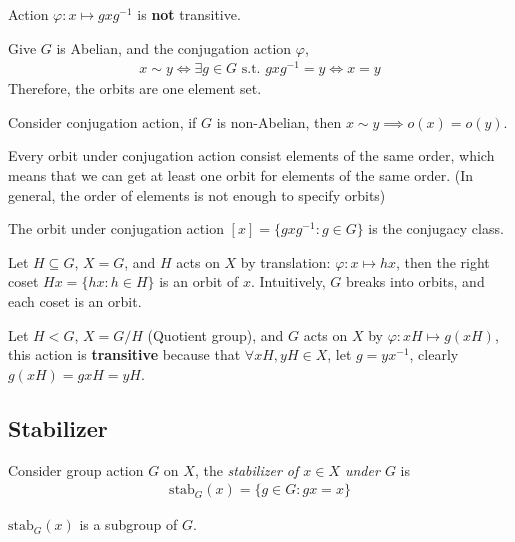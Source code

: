 \begin{remark}
    Action $\varphi: x \mapsto gxg^{-1}$ is \textbf{not} transitive.
\end{remark}

\begin{eg}
    Give $G$ is Abelian, and the conjugation action $\varphi$,
    \begin{align*}
        x \sim y \iff \exists g \in G \text{ s.t. } gxg^{-1}= y \iff x = y
    \end{align*}
    Therefore, the orbits are one element set.
\end{eg}

\begin{prop}
Consider conjugation action, if $G$ is non-Abelian, then $x \sim y \implies o(x) = o(y)$.
\end{prop}

\begin{observe}
    Every orbit under conjugation action consist elements of the same order, which means that we can get at least one orbit for elements of the same order. (In general, the order of elements is not enough to specify orbits)
\end{observe}

\begin{definition}
The orbit under conjugation action $[x] = \{ gxg^{-1} : g \in G \}$ is the conjugacy class.
\end{definition}

\begin{eg}
Let $H \subseteq G$, $X = G$, and $H$ acts on $X$ by translation: $\varphi: x \mapsto hx$, then the right coset $Hx = \{ hx : h \in H \}$ is an orbit of $x$. Intuitively, $G$ breaks into orbits, and each coset is an orbit.
\end{eg}

\begin{eg}
Let $H < G$, $X = G/H$ (Quotient group), and $G$ acts on $X$ by $\varphi: xH \mapsto g(xH)$, this action is \textbf{transitive} because that $\forall xH, yH \in X$, let $g = yx^{-1}$, clearly $g(xH) = gxH = yH$.
\end{eg}

\subsection{Stabilizer} \label{sec:}

\begin{definition}[Stabilizer]
    Consider group action $G$ on $X$, the \textit{stabilizer of $x \in X$ under $G$} is
    \begin{align*}
        \text{stab}_G(x) = \{ g \in G : gx = x \}
    \end{align*}
\end{definition}
\begin{prop}
$\text{stab}_G(x)$ is a subgroup of $G$.
\end{prop}


